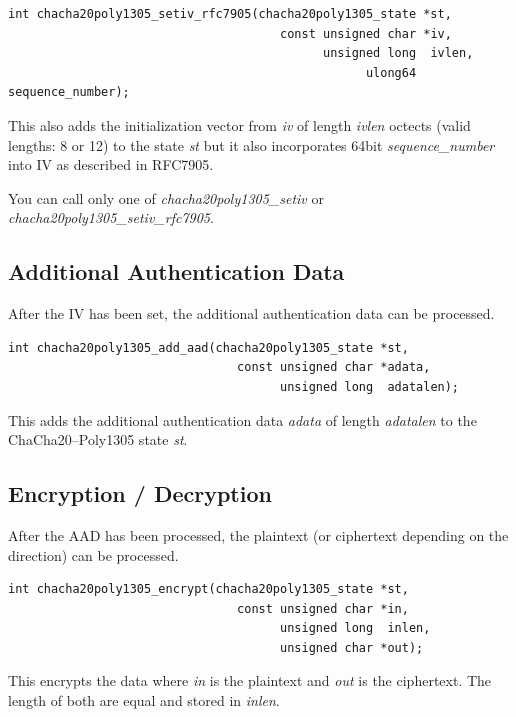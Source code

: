 \documentclass[synpaper]{book}
\begin{document}
\begin{verbatim}
int chacha20poly1305_setiv_rfc7905(chacha20poly1305_state *st,
                                      const unsigned char *iv,
                                            unsigned long  ivlen,
                                                  ulong64  sequence_number);
\end{verbatim}
This also adds the initialization vector from \textit{iv} of length \textit{ivlen} octects (valid lengths: 8 or 12) to
the state \textit{st} but it also incorporates 64bit \textit{sequence\_number} into IV as described in RFC7905.

You can call only one of \textit{chacha20poly1305\_setiv} or \textit{chacha20poly1305\_setiv\_rfc7905}.

\subsection{Additional Authentication Data}
After the IV has been set, the additional authentication data can be processed.

\begin{verbatim}
int chacha20poly1305_add_aad(chacha20poly1305_state *st,
                                const unsigned char *adata,
                                      unsigned long  adatalen);

\end{verbatim}
This adds the additional authentication data \textit{adata} of length \textit{adatalen} to the ChaCha20--Poly1305 state \textit{st}.

\subsection{Encryption / Decryption}
After the AAD has been processed, the plaintext (or ciphertext depending on the direction) can be processed.

\begin{verbatim}
int chacha20poly1305_encrypt(chacha20poly1305_state *st,
                                const unsigned char *in,
                                      unsigned long  inlen,
                                      unsigned char *out);
\end{verbatim}
This encrypts the data where \textit{in} is the plaintext and \textit{out} is the ciphertext. The length of both are equal and stored in \textit{inlen}.
\end{document}
